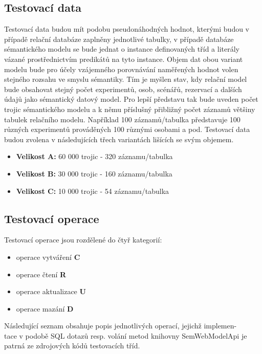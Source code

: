 \documentclass{projekt}
\begin{document}
\subsection{Testovací data}
\hspace{0.65cm}Testovací data budou mít podobu pseudonáhodných hodnot, kterými budou v případě relační databáze zaplněny jednotlivé tabulky, v případě databáze sémantického modelu se bude jednat o instance definovaných tříd a literály vázané prostřednictvím predikátů na tyto instance. Objem dat obou variant modelu bude pro účely vzájemného porovnávání naměřených hodnot volen stejného rozsahu ve smyslu sémantiky. Tím je myšlen stav, kdy relační model bude obsahovat stejný počet experimentů, osob, scénářů, rezervací a dalších údajů jako sémantický datový model. Pro lepší představu tak bude uveden počet trojic sémantického modelu a k němu příslušný přibližný počet záznamů většiny tabulek relačního modelu. Například 100 záznamů/tabulka představuje 100 různých experimentů prováděných 100 různými osobami a pod. Testovací data budou zvolena v následujících třech variantách lišících se svým objemem.


\begin{itemize}
\item {\bf Velikost A:} 60 000 trojic - 320 záznamu/tabulka
\item {\bf Velikost B:} 30 000 trojic - 160 záznamu/tabulka 
\item {\bf Velikost C:} 10 000 trojic - 54 záznamu/tabulka
\end{itemize}

\subsection{Testovací operace}
\hspace{0.65cm}Testovací operace jsou rozdělené do čtyř kategorií:

\begin{itemize}
\item operace vytváření {\bf C} 
\item operace čtení {\bf R} 
\item operace aktualizace {\bf U} 
\item operace mazání {\bf D} 
\end{itemize}

Následující seznam obsahuje popis jednotlivých operací, jejichž implemen-\\tace v podobě SQL dotazů resp. volání metod knihovny SemWebModelApi je patrná ze zdrojových kódů testovacích tříd.
\end{document}
